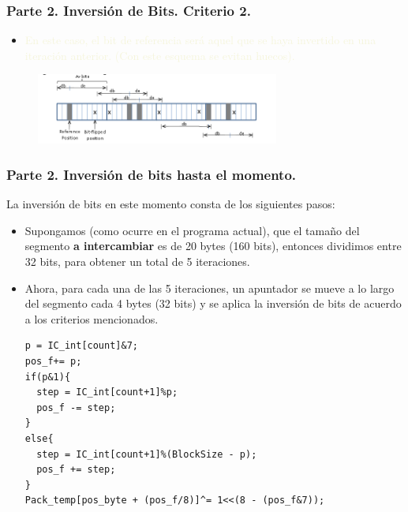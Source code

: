 \documentclass[10pt,fleqn]{beamer}
\begin{document}
{
\begin{frame}
\frametitle{   Parte 2. Inversión de Bits. Criterio 2. }

\begin{itemize}
\item 

\textcolor{beige}{ En este caso, el bit de referencia será aquel que se haya invertido en una iteración anterior. (Con este esquema se evitan huecos).} 






\end{itemize}

\begin{figure}[H]
\centering
\includegraphics[width=8cm]{logos/es2.png}
\end{figure}
\end{frame}
}



\begin{frame}[fragile]
\frametitle{Parte 2. Inversión de bits hasta el momento.  }

La inversión de bits en este momento consta de los siguientes pasos:


\begin{itemize}
\item Supongamos (como ocurre en el programa actual), que el tamaño del segmento \textbf{a intercambiar} es de 20 bytes (160 bits), entonces dividimos entre 32 bits, para obtener un total de 5 iteraciones. 

\item Ahora, para cada una de las 5 iteraciones, un apuntador se mueve a lo largo del segmento cada 4 bytes (32 bits) y se aplica la inversión de bits de acuerdo a los criterios mencionados.

\begin{lstlisting}
p = IC_int[count]&7;
pos_f+= p;				
if(p&1){
  step = IC_int[count+1]%p;
  pos_f -= step;
}
else{
  step = IC_int[count+1]%(BlockSize - p);
  pos_f += step;
}
Pack_temp[pos_byte + (pos_f/8)]^= 1<<(8 - (pos_f&7));			
\end{lstlisting}


\end{itemize}

\end{frame}
\end{document}
